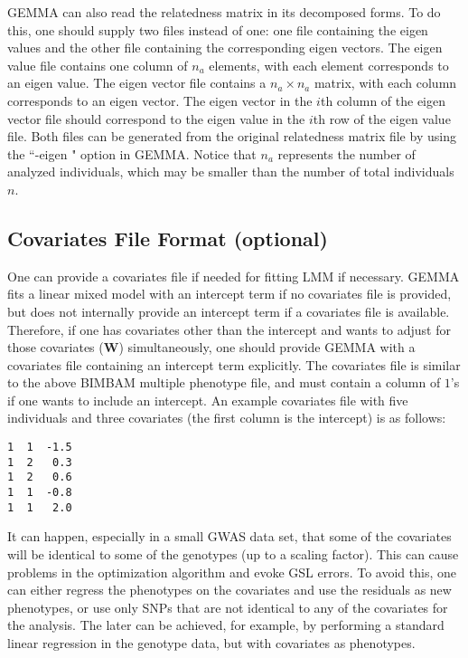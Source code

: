 \documentclass[11pt]{article}
\begin{document}
GEMMA can also read the relatedness matrix in its decomposed forms. To
do this, one should supply two files instead of one: one file
containing the eigen values and the other file containing the
corresponding eigen vectors. The eigen value file contains one column
of $n_{a}$ elements, with each element corresponds to an eigen
value. The eigen vector file contains a $n_a\times n_a$ matrix, with
each column corresponds to an eigen vector. The eigen vector in the
$i$th column of the eigen vector file should correspond to the eigen
value in the $i$th row of the eigen value file. Both files can be
generated from the original relatedness matrix file by using the
``-eigen " option in GEMMA. Notice that $n_a$ represents the number of
analyzed individuals, which may be smaller than the number of total
individuals $n$.

\subsection{Covariates File Format (optional)}

One can provide a covariates file if needed for fitting LMM if
necessary. GEMMA fits a linear mixed model with an intercept term if
no covariates file is provided, but does not internally provide an
intercept term if a covariates file is available. Therefore, if one
has covariates other than the intercept and wants to adjust for those
covariates ($\mathbf W$) simultaneously, one should provide GEMMA with
a covariates file containing an intercept term explicitly. The
covariates file is similar to the above BIMBAM multiple phenotype
file, and must contain a column of $1$'s if one wants to include an
intercept. An example covariates file with five individuals and three
covariates (the first column is the intercept) is as follows:
%
\begin{verbatim}
1  1  -1.5
1  2   0.3
1  2   0.6
1  1  -0.8
1  1   2.0
\end{verbatim}
%
It can happen, especially in a small GWAS data set, that some of the
covariates will be identical to some of the genotypes (up to a scaling
factor). This can cause problems in the optimization algorithm and
evoke GSL errors. To avoid this, one can either regress the phenotypes
on the covariates and use the residuals as new phenotypes, or use only
SNPs that are not identical to any of the covariates for the
analysis. The later can be achieved, for example, by performing a
standard linear regression in the genotype data, but with covariates
as phenotypes.
\end{document}
